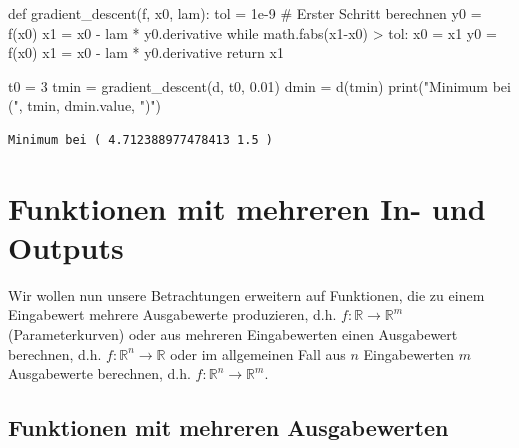 \documentclass[
  a4paper,
  DIV=11]{scrreprt}
\newenvironment{Shaded}{\begin{snugshade}}{\end{snugshade}}
\newcommand{\BuiltInTok}[1]{\textcolor[rgb]{0.00,0.23,0.31}{#1}}
\newcommand{\CommentTok}[1]{\textcolor[rgb]{0.37,0.37,0.37}{#1}}
\newcommand{\ControlFlowTok}[1]{\textcolor[rgb]{0.00,0.23,0.31}{#1}}
\newcommand{\DecValTok}[1]{\textcolor[rgb]{0.68,0.00,0.00}{#1}}
\newcommand{\FloatTok}[1]{\textcolor[rgb]{0.68,0.00,0.00}{#1}}
\newcommand{\KeywordTok}[1]{\textcolor[rgb]{0.00,0.23,0.31}{#1}}
\newcommand{\NormalTok}[1]{\textcolor[rgb]{0.00,0.23,0.31}{#1}}
\newcommand{\OperatorTok}[1]{\textcolor[rgb]{0.37,0.37,0.37}{#1}}
\newcommand{\StringTok}[1]{\textcolor[rgb]{0.13,0.47,0.30}{#1}}
\theoremstyle{definition}
\theoremstyle{definition}
\theoremstyle{remark}
\begin{document}
\begin{tcolorbox}
\begin{Shaded}
\begin{Highlighting}[]
\KeywordTok{def}\NormalTok{ gradient\_descent(f, x0, lam):}
\NormalTok{    tol }\OperatorTok{=} \FloatTok{1e{-}9}
    \CommentTok{\# Erster Schritt berechnen}
\NormalTok{    y0 }\OperatorTok{=}\NormalTok{ f(x0)}
\NormalTok{    x1 }\OperatorTok{=}\NormalTok{ x0 }\OperatorTok{{-}}\NormalTok{ lam }\OperatorTok{*}\NormalTok{ y0.derivative}
    \ControlFlowTok{while}\NormalTok{ math.fabs(x1}\OperatorTok{{-}}\NormalTok{x0) }\OperatorTok{\textgreater{}}\NormalTok{ tol:}
\NormalTok{        x0 }\OperatorTok{=}\NormalTok{ x1}
\NormalTok{        y0 }\OperatorTok{=}\NormalTok{ f(x0)}
\NormalTok{        x1 }\OperatorTok{=}\NormalTok{ x0 }\OperatorTok{{-}}\NormalTok{ lam }\OperatorTok{*}\NormalTok{ y0.derivative}
    \ControlFlowTok{return}\NormalTok{ x1}


\NormalTok{t0 }\OperatorTok{=} \DecValTok{3}
\NormalTok{tmin }\OperatorTok{=}\NormalTok{ gradient\_descent(d, t0, }\FloatTok{0.01}\NormalTok{)}
\NormalTok{dmin }\OperatorTok{=}\NormalTok{ d(tmin)}
\BuiltInTok{print}\NormalTok{(}\StringTok{"Minimum bei ("}\NormalTok{, tmin, dmin.value, }\StringTok{")"}\NormalTok{)}
\end{Highlighting}
\end{Shaded}

\begin{verbatim}
Minimum bei ( 4.712388977478413 1.5 )
\end{verbatim}

\end{tcolorbox}


\hypertarget{sec-HigherDimFunctions}{%
\chapter{Funktionen mit mehreren In- und
Outputs}\label{sec-HigherDimFunctions}}

Wir wollen nun unsere Betrachtungen erweitern auf Funktionen, die zu
einem Eingabewert mehrere Ausgabewerte produzieren, d.h.
\(f : \mathbb{R}\rightarrow\mathbb{R}^m\) (Parameterkurven) oder aus
mehreren Eingabewerten einen Ausgabewert berechnen, d.h.
\(f : \mathbb{R}^n \rightarrow\mathbb{R}\) oder im allgemeinen Fall aus
\(n\) Eingabewerten \(m\) Ausgabewerte berechnen, d.h.
\(f : \mathbb{R}^n \rightarrow\mathbb{R}^m\).

\hypertarget{funktionen-mit-mehreren-ausgabewerten}{%
\section{Funktionen mit mehreren
Ausgabewerten}\label{funktionen-mit-mehreren-ausgabewerten}}
\end{document}
